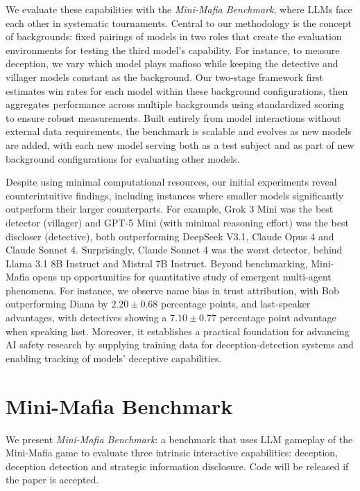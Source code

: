 \documentclass{article}
\begin{document}
We evaluate these capabilities with the \textit{Mini-Mafia Benchmark}, where LLMs face each other in systematic tournaments. Central to our methodology is the concept of backgrounds: fixed pairings of models in two roles that create the evaluation environments for testing the third model’s capability. For instance, to measure deception, we vary which model plays mafioso while keeping the detective and villager models constant as the background. Our two-stage framework first estimates win rates for each model within these background configurations, then aggregates performance across multiple backgrounds using standardized scoring to ensure robust measurements. Built entirely from model interactions without external data requirements, the benchmark is scalable and evolves as new models are added, with each new model serving both as a test subject and as part of new background configurations for evaluating other models.

Despite using minimal computational resources, our initial experiments reveal counterintuitive findings, including instances where smaller models significantly outperform their larger counterparts. For example, Grok 3 Mini was the best detector (villager) and GPT-5 Mini (with minimal reasoning effort) was the best discloser (detective), both outperforming DeepSeek V3.1, Claude Opus 4 and Claude Sonnet 4. Surprisingly, Claude Sonnet 4 was the worst detector, behind Llama 3.1 8B Instruct and Mistral 7B Instruct. Beyond benchmarking, Mini-Mafia opens up  opportunities for quantitative study of emergent multi-agent phenomena. For instance, we observe name bias in trust attribution, with Bob outperforming Diana by $2.20 \pm 0.68$ percentage points, and last-speaker advantages, with detectives showing a $7.10 \pm 0.77$ percentage point advantage when speaking last. Moreover, it establishes a practical foundation for advancing AI safety research by supplying training data for deception-detection systems and enabling tracking of models’ deceptive capabilities.




\section{Mini-Mafia Benchmark}

We present \textit{Mini-Mafia Benchmark}: a benchmark that uses LLM gameplay of the Mini-Mafia game to evaluate three intrinsic interactive capabilities: deception, deception detection and strategic information disclosure. Code will be released if the paper is accepted.
\end{document}
